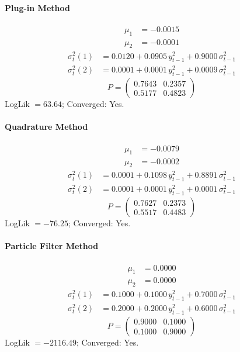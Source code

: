 \documentclass[11pt, a4paper]{article}
\begin{document}
\paragraph{Plug-in Method}
\begin{align}
\mu_{1} &= -0.0015 \\
\mu_{2} &= -0.0001
\end{align}
\begin{align}
\sigma^2_{t}(1) &= 0.0120 + 0.0905\, y_{t-1}^2 + 0.9000\, \sigma^2_{t-1} \\
\sigma^2_{t}(2) &= 0.0001 + 0.0001\, y_{t-1}^2 + 0.0009\, \sigma^2_{t-1}
\end{align}
\begin{equation}
P = \begin{pmatrix} 0.7643 & 0.2357 \\ 0.5177 & 0.4823 \end{pmatrix}
\end{equation}
LogLik $= 63.64$; Converged: Yes.

\paragraph{Quadrature Method}
\begin{align}
\mu_{1} &= -0.0079 \\
\mu_{2} &= -0.0002
\end{align}
\begin{align}
\sigma^2_{t}(1) &= 0.0001 + 0.1098\, y_{t-1}^2 + 0.8891\, \sigma^2_{t-1} \\
\sigma^2_{t}(2) &= 0.0001 + 0.0001\, y_{t-1}^2 + 0.0001\, \sigma^2_{t-1}
\end{align}
\begin{equation}
P = \begin{pmatrix} 0.7627 & 0.2373 \\ 0.5517 & 0.4483 \end{pmatrix}
\end{equation}
LogLik $= -76.25$; Converged: Yes.

\paragraph{Particle Filter Method}
\begin{align}
\mu_{1} &= 0.0000 \\
\mu_{2} &= 0.0000
\end{align}
\begin{align}
\sigma^2_{t}(1) &= 0.1000 + 0.1000\, y_{t-1}^2 + 0.7000\, \sigma^2_{t-1} \\
\sigma^2_{t}(2) &= 0.2000 + 0.2000\, y_{t-1}^2 + 0.6000\, \sigma^2_{t-1}
\end{align}
\begin{equation}
P = \begin{pmatrix} 0.9000 & 0.1000 \\ 0.1000 & 0.9000 \end{pmatrix}
\end{equation}
LogLik $= -2116.49$; Converged: Yes.
\end{document}

